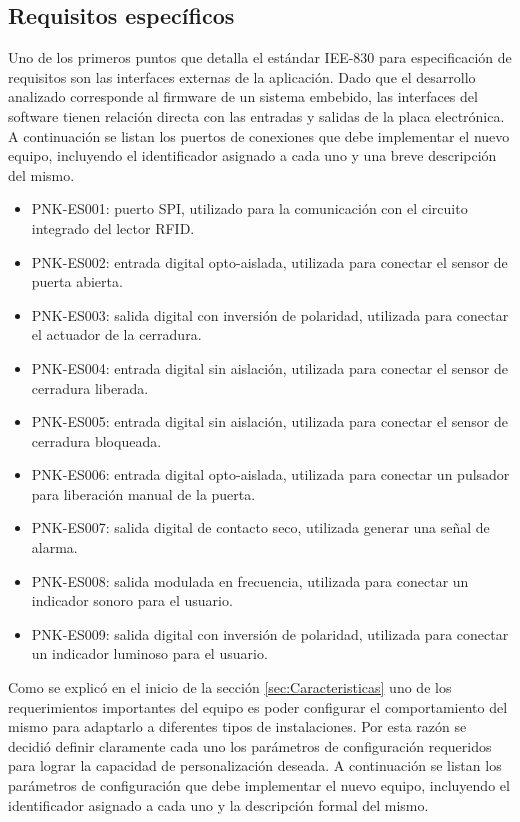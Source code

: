 \subsection{Requisitos específicos}
\label{sub:Requisitos}

Uno de los primeros puntos que detalla el estándar IEE-830 para especificación de requisitos son las interfaces externas de la aplicación. Dado que el desarrollo analizado corresponde al firmware de un sistema embebido, las interfaces del software tienen relación directa con las entradas y salidas de la placa electrónica. A continuación se listan los puertos de conexiones que debe implementar el nuevo equipo, incluyendo el identificador asignado a cada uno y una breve descripción del mismo.

\begin{itemize}
	\item PNK-ES001: puerto SPI, utilizado para la comunicación con el circuito integrado del lector RFID.
	\item PNK-ES002: entrada digital opto-aislada, utilizada para conectar el sensor de puerta abierta.
	\item PNK-ES003: salida digital con inversión de polaridad, utilizada para conectar el actuador de la cerradura.
	\item PNK-ES004: entrada digital sin aislación, utilizada para conectar el sensor de cerradura liberada.
	\item PNK-ES005: entrada digital sin aislación, utilizada para conectar el sensor de cerradura bloqueada.
	\item PNK-ES006: entrada digital opto-aislada, utilizada para conectar un pulsador para liberación manual de la puerta.
	\item PNK-ES007: salida digital de contacto seco, utilizada generar una señal de alarma.
	\item PNK-ES008: salida modulada en frecuencia, utilizada para conectar un indicador sonoro para el usuario.
	\item PNK-ES009: salida digital con inversión de polaridad, utilizada para conectar un indicador luminoso para el usuario.
\end{itemize}

Como se explicó en el inicio de la sección \ref{sec:Caracteristicas} uno de los requerimientos importantes del equipo es poder configurar el comportamiento del mismo para adaptarlo a diferentes tipos de instalaciones. Por esta razón se decidió definir claramente cada uno los parámetros de configuración requeridos para lograr la capacidad de personalización deseada. A continuación se listan los parámetros de configuración que debe implementar el nuevo equipo, incluyendo el identificador asignado a cada uno y la descripción formal del mismo.

